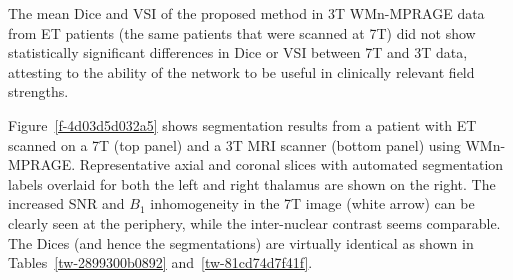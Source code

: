 \documentclass[3p,,final,12pt]{elsarticle}
\begin{document}
The mean Dice and VSI of the proposed method in 3T WMn-MPRAGE data from ET patients (the same patients that were scanned at 7T) did not show statistically significant differences in Dice or VSI between 7T and 3T data, attesting to the ability of the network to be useful in clinically relevant field strengths. 

Figure~\ref{f-4d03d5d032a5}  shows segmentation results from a patient with ET scanned on a 7T (top panel) and a 3T MRI scanner (bottom panel) using WMn-MPRAGE. Representative axial and coronal slices with automated segmentation labels overlaid for both the left and right thalamus are shown on the right. The increased SNR and $B_1$ inhomogeneity in the 7T image (white arrow) can be clearly seen at the periphery, while the inter-nuclear contrast seems comparable. The Dices (and hence the segmentations) are virtually identical as shown in Tables~\ref{tw-2899300b0892} and~\ref{tw-81cd74d7f41f}.
\end{document}
